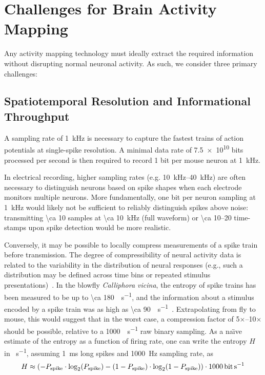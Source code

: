 \section{Challenges for Brain Activity Mapping}
\label{sec:challenges}
Any activity mapping technology must ideally extract the required information without disrupting normal neuronal activity.
As such, we consider three primary challenges:

\subsection{Spatiotemporal Resolution and Informational Throughput}

A sampling rate of \SI{1}{\kilo\hertz} is necessary to capture the fastest trains of action potentials at single-spike resolution.
A minimal data rate of \num{7.5e10} bits processed per second is then required to record 1 bit per mouse neuron at \SI{1}{\kilo\hertz}.

In electrical recording, higher sampling rates (e.g. \SIrange{10}{40}{\kilo\hertz}) are often necessary to distinguish neurons based on spike shapes when each electrode monitors multiple neurons.
More fundamentally, one bit per neuron sampling at \SI{1}{\kilo\hertz} would likely not be sufficient to reliably distinguish spikes above noise: transmitting \SI{\ca 10}{\bit} samples at \SI{\ca 10}{\kilo\hertz} (full waveform) or \SIrange{\ca 10}{20}{\bit} time-stamps upon spike detection would be more realistic.

Conversely, it may be possible to locally compress measurements of a spike train before transmission.
The degree of compressibility of neural activity data is related to the variability in the distribution of neural responses (e.g., such a distribution may be defined across time bins or repeated stimulus presentations)~\cite{strong98}.
In the blowfly \textit{Calliphora vicina}, the entropy of spike trains has been measured to be up to \SI{\ca 180}{\bit\per\second}, and the information about a stimulus encoded by a spike train was as high as \SI{\ca 90}{\bit\per\second}~\cite{strong98}. Extrapolating from fly to mouse, this would suggest that in the worst case, a compression factor of 5$\times$--10$\times$ should be possible, relative to a \SI{1000}{\bit\per\second} raw binary sampling. As a na\"{\i}ve estimate of the entropy as a function of firing rate, one can write the entropy $H$ in \si{\bit\per\second}, assuming \SI{1}{\milli\second} long spikes and \SI{1000}{\hertz} sampling rate, as
\[H \approx \left(-P\sub{spike}\cdot\log_2\!\left(P\sub{spike}\right) - \left(1 - P\sub{spike}\right)\cdot\log_2\!\left(1 - P\sub{spike}\right)\right) \cdot \SI{1000}{\bit\per\second}\]

